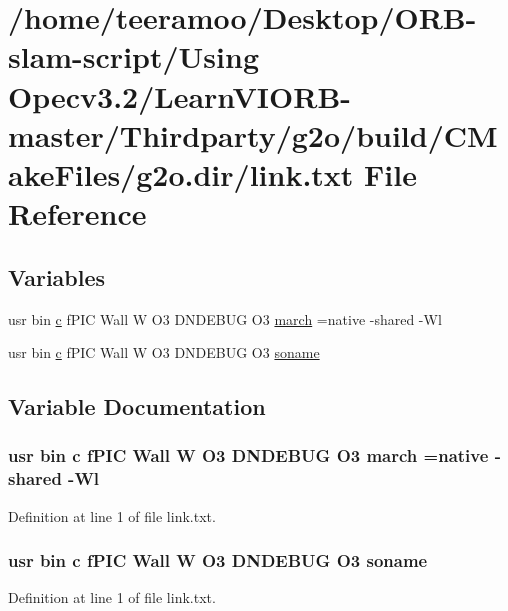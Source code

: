 \hypertarget{link_8txt}{}\section{/home/teeramoo/\+Desktop/\+O\+R\+B-\/slam-\/script/\+Using Opecv3.2/\+Learn\+V\+I\+O\+R\+B-\/master/\+Thirdparty/g2o/build/\+C\+Make\+Files/g2o.dir/link.txt File Reference}
\label{link_8txt}
\subsection*{Variables}
\begin{DoxyCompactItemize}
\item 
usr bin \hyperlink{sparse__helper_8cpp_a4e1e0e72dd773439e333c84dd762a9c3}{c} f\+P\+IC Wall W O3 D\+N\+D\+E\+B\+UG O3 \hyperlink{link_8txt_ab51da2d81b24c1e8cfabe59232fc7571}{march} =native -\/shared -\/Wl
\item 
usr bin \hyperlink{sparse__helper_8cpp_a4e1e0e72dd773439e333c84dd762a9c3}{c} f\+P\+IC Wall W O3 D\+N\+D\+E\+B\+UG O3 \hyperlink{link_8txt_a52f96c06bd8d5676ea0fc57177daa67f}{soname}
\end{DoxyCompactItemize}


\subsection{Variable Documentation}
\subsubsection[{\texorpdfstring{march}{march}}]{\setlength{\rightskip}{0pt plus 5cm}usr bin {\bf c} f\+P\+IC Wall W O3 D\+N\+D\+E\+B\+UG O3 march =native -\/shared -\/Wl}\hypertarget{link_8txt_ab51da2d81b24c1e8cfabe59232fc7571}{}\label{link_8txt_ab51da2d81b24c1e8cfabe59232fc7571}


Definition at line 1 of file link.\+txt.

\subsubsection[{\texorpdfstring{soname}{soname}}]{\setlength{\rightskip}{0pt plus 5cm}usr bin {\bf c} f\+P\+IC Wall W O3 D\+N\+D\+E\+B\+UG O3 soname}\hypertarget{link_8txt_a52f96c06bd8d5676ea0fc57177daa67f}{}\label{link_8txt_a52f96c06bd8d5676ea0fc57177daa67f}


Definition at line 1 of file link.\+txt.

